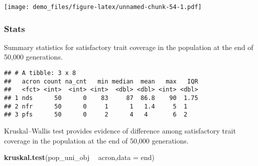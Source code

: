 \documentclass[]{book}
\newenvironment{Shaded}{\begin{snugshade}}{\end{snugshade}}
\newcommand{\DataTypeTok}[1]{\textcolor[rgb]{0.13,0.29,0.53}{#1}}
\newcommand{\KeywordTok}[1]{\textcolor[rgb]{0.13,0.29,0.53}{\textbf{#1}}}
\newcommand{\NormalTok}[1]{#1}
\newcommand{\OperatorTok}[1]{\textcolor[rgb]{0.81,0.36,0.00}{\textbf{#1}}}
\newcommand{\OtherTok}[1]{\textcolor[rgb]{0.56,0.35,0.01}{#1}}
\newcommand{\StringTok}[1]{\textcolor[rgb]{0.31,0.60,0.02}{#1}}
\begin{document}
\texttt{[image: demo\_files/figure-latex/unnamed-chunk-54-1.pdf]}

\hypertarget{stats-9}{%
\subsubsection{Stats}\label{stats-9}}

Summary statistics for satisfactory trait coverage in the population at the end of 50,000 generations.

\begin{Shaded}
\end{Shaded}

\begin{verbatim}
## # A tibble: 3 x 8
##   acron count na_cnt   min median  mean   max   IQR
##   <fct> <int>  <int> <int>  <dbl> <dbl> <int> <dbl>
## 1 nds      50      0    83     87  86.8    90  1.75
## 2 nfr      50      0     1      1   1.4     5  1   
## 3 pfs      50      0     2      4   4       6  2
\end{verbatim}

Kruskal--Wallis test provides evidence of difference among satisfactory trait coverage in the population at the end of 50,000 generations.

\begin{Shaded}
\begin{Highlighting}[]
\KeywordTok{kruskal.test}\NormalTok{(pop_uni_obj }\OperatorTok{~}\StringTok{ }\NormalTok{acron,}\DataTypeTok{data =}\NormalTok{ end)}
\end{Highlighting}
\end{Shaded}
\end{document}

